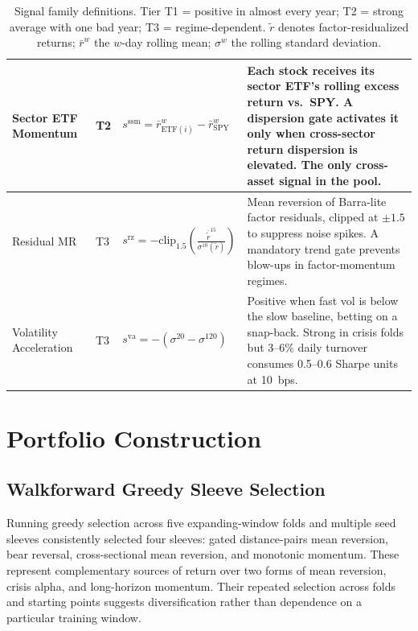 \documentclass{article}
\begin{document}
\begin{table}[H]
\begin{tabularx}{\textwidth}{p{} p{} >{\raggedright\arraybackslash}X >{\raggedright\arraybackslash}p{}}
        Sector ETF Momentum &
        T2 &
        $s^{\mathrm{ssm}} = \bar{r}^w_{\mathrm{ETF}(i)} - \bar{r}^w_{\mathrm{SPY}}$ &
        Each stock receives its sector ETF's rolling excess return vs.\ SPY. A dispersion gate activates it only when cross-sector return dispersion is elevated. The only cross-asset signal in the pool. \\
        \midrule

        Residual MR &
        T3 &
        $s^{\mathrm{rz}} = -\mathrm{clip}_{1.5}(\frac{\bar{\tilde{r}}^{15}}{\sigma^{10}(\tilde{r})})$ &
        Mean reversion of Barra-lite factor residuals, clipped at $\pm 1.5$ to suppress noise spikes. A mandatory trend gate prevents blow-ups in factor-momentum regimes. \\
        \midrule

        Volatility Acceleration &
        T3 &
        $s^{\mathrm{va}} = -(\sigma^{20} - \sigma^{120})$ &
        Positive when fast vol is below the slow baseline, betting on a snap-back. Strong in crisis folds but 3--6\% daily turnover consumes 0.5--0.6 Sharpe units at 10~bps. \\

        \bottomrule
    \end{tabularx}
    \caption{Signal family definitions. Tier T1 = positive in almost every year; T2 = strong average with one bad year; T3 = regime-dependent. $\tilde{r}$ denotes factor-residualized returns; $\bar{r}^w$ the $w$-day rolling mean; $\sigma^w$ the rolling standard deviation.}
    \label{tab:signal_families}
\end{table}

\section{Portfolio Construction}

\subsection{Walkforward Greedy Sleeve Selection}

Running greedy selection across five expanding-window folds and multiple seed sleeves consistently selected four sleeves: gated distance-pairs mean reversion, bear reversal, cross-sectional mean reversion, and monotonic momentum. These represent complementary sources of return over two forms of mean reversion, crisis alpha, and long-horizon momentum. Their repeated selection across folds and starting points suggests diversification rather than dependence on a particular training window.
\end{document}
